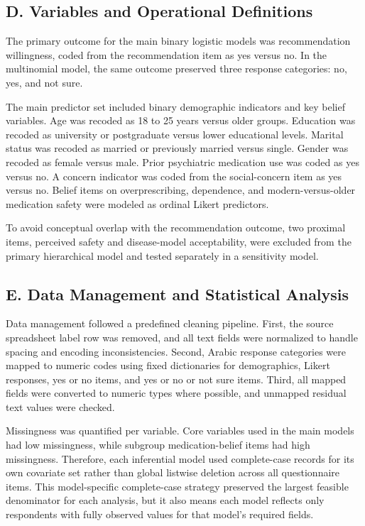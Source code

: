 \documentclass[12pt,a4paper]{article}
\begin{document}
\subsection*{D. Variables and Operational Definitions}
The primary outcome for the main binary logistic models was recommendation willingness, coded from the recommendation item as yes versus no. In the multinomial model, the same outcome preserved three response categories: no, yes, and not sure.

The main predictor set included binary demographic indicators and key belief variables. Age was recoded as 18 to 25 years versus older groups. Education was recoded as university or postgraduate versus lower educational levels. Marital status was recoded as married or previously married versus single. Gender was recoded as female versus male. Prior psychiatric medication use was coded as yes versus no. A concern indicator was coded from the social-concern item as yes versus no. Belief items on overprescribing, dependence, and modern-versus-older medication safety were modeled as ordinal Likert predictors.

To avoid conceptual overlap with the recommendation outcome, two proximal items, perceived safety and disease-model acceptability, were excluded from the primary hierarchical model and tested separately in a sensitivity model.

\subsection*{E. Data Management and Statistical Analysis}
Data management followed a predefined cleaning pipeline. First, the source spreadsheet label row was removed, and all text fields were normalized to handle spacing and encoding inconsistencies. Second, Arabic response categories were mapped to numeric codes using fixed dictionaries for demographics, Likert responses, yes or no items, and yes or no or not sure items. Third, all mapped fields were converted to numeric types where possible, and unmapped residual text values were checked.

Missingness was quantified per variable. Core variables used in the main models had low missingness, while subgroup medication-belief items had high missingness. Therefore, each inferential model used complete-case records for its own covariate set rather than global listwise deletion across all questionnaire items. This model-specific complete-case strategy preserved the largest feasible denominator for each analysis, but it also means each model reflects only respondents with fully observed values for that model’s required fields.
\end{document}
